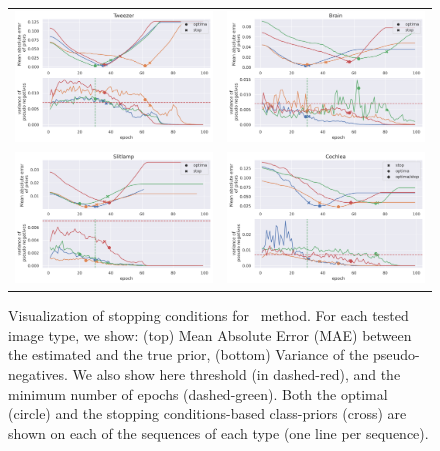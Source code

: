 \begin{figure}[t]
\caption{Visualization of stopping conditions for \SSnnPU~method. For each tested image type, we show: (top) Mean Absolute Error (MAE) between the estimated and the true prior, (bottom) Variance of the pseudo-negatives. We also show here threshold (in dashed-red), and the minimum number of epochs (dashed-green). Both the optimal (circle) and the stopping conditions-based class-priors (cross) are shown on each of the sequences of each type (one line per sequence). }
\centering
\begin{tabular}{@{}cc@{}}
    \includegraphics[width=.5\textwidth]{pics/tweezer_priors.png} &
    \includegraphics[width=.5\textwidth]{pics/brain_priors.png} \\
    \includegraphics[width=.5\textwidth]{pics/slitlamp_priors.png} &
    \includegraphics[width=.5\textwidth]{pics/cochlea_priors.png} \\
\end{tabular}
\label{fig:converge}
\end{figure}

